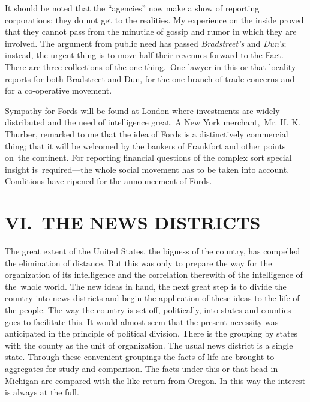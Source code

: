\documentclass[twoside,symmetric,nobib,justified]{tufte-book}
\begin{document}
It should be noted that the ``agencies'' now make a show of reporting
corporations; they do not get to the realities. My experience on the
inside proved that they cannot pass from the minutiae of gossip and
rumor in which they are involved. The argument from public need has
passed \emph{Bradstreet's} and \emph{Dun's}; instead, the urgent thing
is to move half their revenues forward to the Fact. There are three
collections of the one thing.~One lawyer in this or that locality
reports for both Bradstreet and Dun, for the one-branch-of-trade
concerns and for a co-operative movement.~

Sympathy for Fords will be found at London where investments are widely
distributed and the need of intelligence great. A New York merchant,~Mr.
H. K. Thurber, remarked to me that the idea of Fords is a distinctively
commercial thing; that it will be welcomed by the bankers of Frankfort
and other points on~the continent. For reporting financial questions of
the complex sort special insight is~required---the whole social movement
has to be taken into account. Conditions have ripened for the
announcement of Fords.~

\hypertarget{vi-the-news-districts}{%
\section{VI.~THE NEWS DISTRICTS~}\label{vi-the-news-districts}}

The great extent of the United States, the bigness of the country, has
compelled the elimination of distance. But this was only to prepare the
way for the organization of its intelligence and the correlation
therewith of the intelligence of the~whole world. The new ideas in hand,
the next great step is to divide the country into news districts and
begin the application of these ideas to the life of the people. The way
the country is set off, politically, into states and counties goes to
facilitate this. It would almost seem that the present necessity was
anticipated in the principle of political division. There is the
grouping by states with the county as the unit of organization. The
usual news district is a single state. Through these convenient
groupings the facts of life are brought to aggregates for study and
comparison. The facts under this or that head in Michigan are compared
with the like return from Oregon. In this way the interest is always at
the full.~
\end{document}
